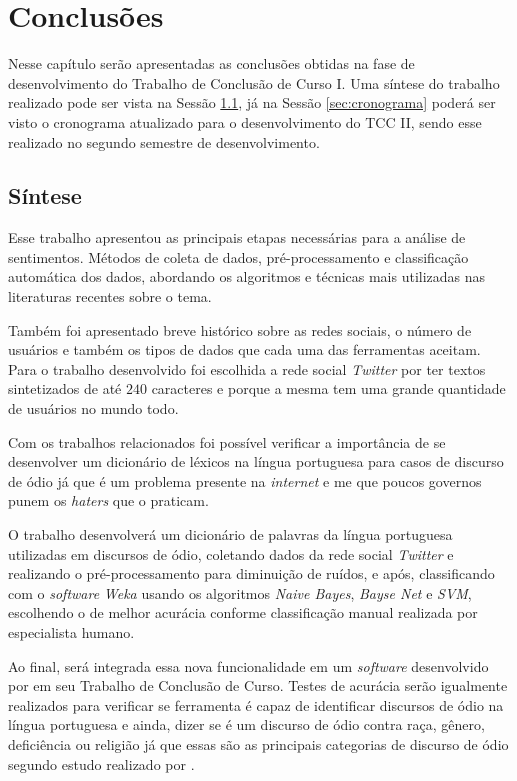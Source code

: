 \chapter{Conclusões}
\label{cap:conclusoes}
Nesse capítulo serão apresentadas as conclusões obtidas na fase de desenvolvimento do Trabalho de Conclusão de Curso I. Uma síntese do trabalho realizado pode ser vista na Sessão \ref{sec:sintese}, já na Sessão \ref{sec:cronograma} poderá ser visto o cronograma atualizado para o desenvolvimento do TCC II, sendo esse realizado no segundo semestre de desenvolvimento.

\section{Síntese}
\label{sec:sintese}

Esse trabalho apresentou as principais etapas necessárias para a análise de sentimentos. Métodos de coleta de dados, pré-processamento e classificação automática dos dados, abordando os algoritmos e técnicas mais utilizadas nas literaturas recentes sobre o tema.

Também foi apresentado breve histórico sobre as redes sociais, o número de usuários e também os tipos de dados que cada uma das ferramentas aceitam. Para o trabalho desenvolvido foi escolhida a rede social \textit{Twitter} por ter textos sintetizados de até $240$ caracteres e porque a mesma tem uma grande quantidade de usuários no mundo todo.

Com os trabalhos relacionados foi possível verificar a importância de se desenvolver um dicionário de léxicos na língua portuguesa para casos de discurso de ódio já que é um problema presente na \textit{internet} e me que poucos governos punem os \textit{haters} que o praticam.

O trabalho desenvolverá um dicionário de palavras da língua portuguesa utilizadas em discursos de ódio, coletando dados da rede social \textit{Twitter} e realizando o pré-processamento para diminuição de ruídos, e após, classificando com o \textit{software} \textit{Weka} usando os algoritmos \textit{Naive Bayes}, \textit{Bayse Net} e \textit{SVM}, escolhendo o de melhor acurácia conforme classificação manual realizada por especialista humano.

Ao final, será integrada essa nova funcionalidade em um \textit{software} desenvolvido por  em seu Trabalho de Conclusão de Curso. Testes de acurácia serão igualmente realizados para verificar se ferramenta é capaz de identificar discursos de ódio na língua portuguesa e ainda, dizer se é um discurso de ódio contra raça, gênero, deficiência ou religião já que essas são as principais categorias de discurso de ódio segundo estudo realizado por .

